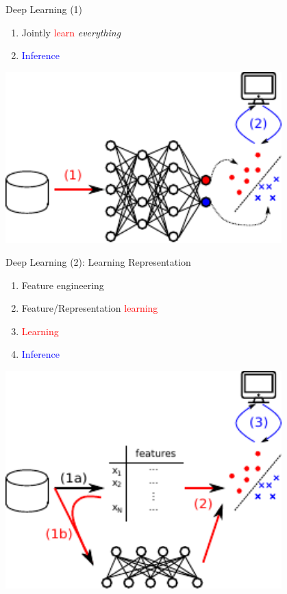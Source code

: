 \documentclass{beamer}
\newcommand{\tred}[1]{\textcolor{red}{#1}}
\newcommand{\tblue}[1]{\textcolor{blue}{#1}}
\begin{document}
\begin{frame}{Deep Learning (1)}
    \raggedright
    \begin{enumerate}
        \item Jointly \tred{learn} \emph{everything}
        \item \tblue{Inference}
    \end{enumerate}

    \vspace{-24mm}
    \begin{center}
    \includegraphics[width=0.8\textwidth]{pipeline3.pdf}
    \end{center}

\end{frame}

\begin{frame}{Deep Learning (2): Learning Representation}
    \raggedright
    \begin{enumerate}
    \itemsep 0em
        \item[1a.] Feature engineering
        \item[1b.] Feature/Representation \tred{learning}
        \item[2.] \tred{Learning}
        \item[3.] \tblue{Inference}
    \end{enumerate}

    \vspace{-28mm}
    \begin{center}
    \includegraphics[width=0.8\textwidth]{pipeline2.pdf}
    \end{center}

\end{frame}
\end{document}
